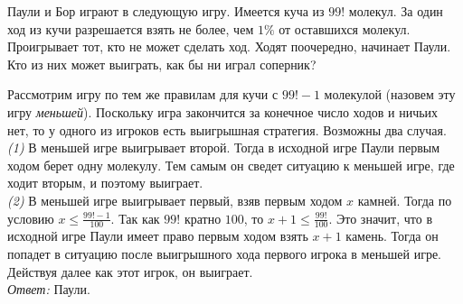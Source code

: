 \problem
Паули и Бор играют в следующую игру.
Имеется куча из $99!$ молекул.
За один ход из кучи разрешается взять не более, чем $1\%$ от оставшихся
молекул.
Проигрывает тот, кто не может сделать ход.
Ходят поочередно, начинает Паули.
Кто из них может выиграть, как бы ни играл соперник?

\solution
Рассмотрим игру по тем же правилам для кучи с $99! - 1$ молекулой
(назовем эту игру \emph{меньшей}).
Поскольку игра закончится за конечное число ходов и ничьих нет, то у одного из
игроков есть выигрышная стратегия.
Возможны два случая.
\\
\emph{(1)}
В меньшей игре выигрывает второй.
Тогда в исходной игре Паули первым ходом берет одну молекулу.
Тем самым он сведет ситуацию к меньшей игре, где ходит вторым, и поэтому
выиграет.
\\
\emph{(2)}
В меньшей игре выигрывает первый, взяв первым ходом $x$ камней.
Тогда по условию $x \leq \frac{99! - 1}{100}$.
Так как $99!$ кратно $100$, то $x + 1 \leq \frac{99!}{100}$.
Это значит, что в исходной игре Паули имеет право первым ходом взять $x + 1$
камень.
Тогда он попадет в ситуацию после выигрышного хода первого игрока в меньшей
игре.
Действуя далее как этот игрок, он выиграет.
\\
\emph{Ответ:} Паули.

\endproblem
